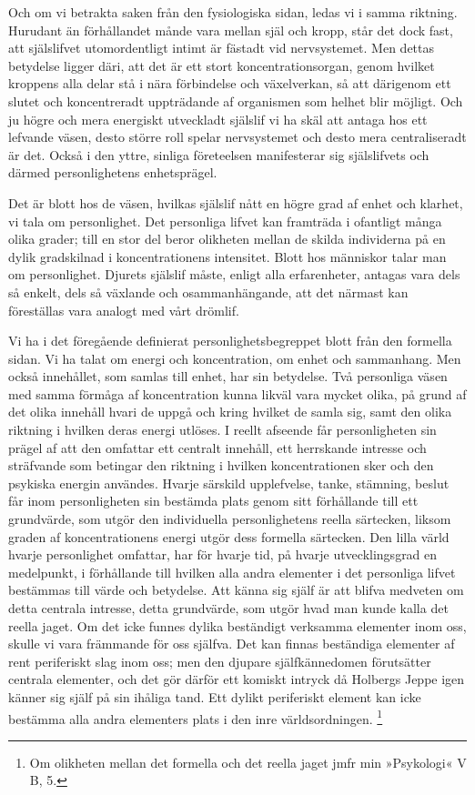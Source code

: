 \documentclass[12pt]{article}
\newcommand{\opage}[1]{\marginnote{\footnotesize\textit{[#1]}}}
\begin{document}
Och om vi betrakta saken från den fysiologiska sidan, ledas vi i samma riktning. Hurudant än förhållandet månde vara mellan själ och kropp, står det dock fast, att själslifvet utomordentligt intimt är fästadt vid nervsystemet. Men dettas betydelse ligger däri, att det är ett stort koncentrationsorgan, genom hvilket kroppens alla delar stå i nära förbindelse och växelverkan, så att därigenom ett slutet och koncentreradt uppträdande af organismen som helhet blir möjligt. Och ju högre och mera energiskt utveckladt själslif vi ha skäl att antaga hos ett lefvande väsen, desto större roll spelar %
\opage{34}
nervsystemet och desto mera centraliseradt är det. Också i den yttre, sinliga företeelsen manifesterar sig själslifvets och därmed personlighetens enhetsprägel.

Det är blott hos de väsen, hvilkas själslif nått en högre grad af enhet och klarhet, vi tala om personlighet. Det personliga lifvet kan framträda i ofantligt många olika grader; till en stor del beror olikheten mellan de skilda individerna på en dylik gradskilnad i koncentrationens intensitet. Blott hos människor talar man om personlighet. Djurets själslif måste, enligt alla erfarenheter, antagas vara dels så enkelt, dels så växlande och osammanhängande, att det närmast kan föreställas vara analogt med vårt drömlif.

Vi ha i det föregående definierat personlighetsbegreppet blott från den formella sidan. Vi ha talat om energi och koncentration, om enhet och sammanhang. Men också innehållet, som samlas till enhet, har sin betydelse. Två personliga väsen med samma förmåga af koncentration kunna likväl vara mycket olika, på grund af det olika innehåll hvari de uppgå och kring hvilket de samla sig, samt den olika riktning i hvilken deras energi utlöses. %
\opage{35}
I reellt afseende får personligheten sin prägel af att den omfattar ett centralt innehåll, ett herrskande intresse och sträfvande som betingar den riktning i hvilken koncentrationen sker och den psykiska energin användes. Hvarje särskild upplefvelse, tanke, stämning, beslut får inom personligheten sin bestämda plats genom sitt förhållande till ett grundvärde, som utgör den individuella personlighetens reella särtecken, liksom graden af koncentrationens energi utgör dess formella särtecken. Den lilla värld hvarje personlighet omfattar, har för hvarje tid, på hvarje utvecklingsgrad en medelpunkt, i förhållande till hvilken alla andra elementer i det personliga lifvet bestämmas till värde och betydelse. Att känna sig själf är att blifva medveten om detta centrala intresse, detta grundvärde, som utgör hvad man kunde kalla det reella jaget. Om det icke funnes dylika beständigt verksamma elementer inom  oss, skulle vi vara främmande för oss själfva. Det kan finnas beständiga elementer af rent periferiskt slag inom oss; men den djupare själfkännedomen förutsätter centrala elementer, och det gör därför ett komiskt intryck då Holbergs Jeppe igen%
\opage{36}
känner sig själf på sin ihåliga tand. Ett dylikt periferiskt element kan icke bestämma alla andra elementers plats i den inre världsordningen. %
\footnote[1]{Om olikheten mellan det formella och det reella jaget jmfr min »Psykologi« V B, 5.}
\end{document}
